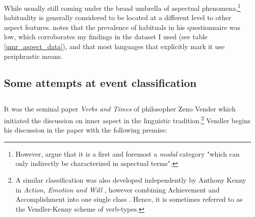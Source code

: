 While usually still coming under the broad umbrella of aspectual phenomena,\footnote{However, \citet{10.1093/acprof:oso/9780199544325.003.0016} argue that it is a first and foremost a \emph{modal} category "which can only indirectly be characterized in aspectual terms".} habituality is generally considered to be located at a different level to other aspect features. \citet{Dahl1985TenseAA} notes that the prevalence of habituals in his questionnaire was low, which corroborates my findings in the dataset I used (see table \ref{umr_aspect_data}), and that most languages that explicitly mark it use periphrastic means.

\subsection{Some attempts at event classification}
\subsection*{\citet{vendler57}}
It was the seminal paper \emph{Verbs and Times} \citep{vendler57} of philosopher Zeno Vender which initiated the discussion on inner aspect in the linguistic tradition.\footnote{A similar classification was also developed independently by Anthony Kenny in \emph{Action, Emotion and Will} \citep{Kenny1963-KENAEA}, however combining Achievement and Accomplishment into one single class \citep{19c36731-bdec-362e-9f45-1aaba76109d7}. Hence, it is sometimes referred to as the Vendler-Kenny scheme of verb-types.} Vendler begins his discussion in the paper with the following premise:


